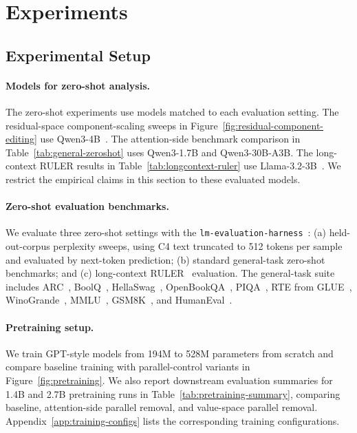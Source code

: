 \section{Experiments}
\label{sec:experiments}

\subsection{Experimental Setup}
\label{sec:setup}

\paragraph{Models for zero-shot analysis.}
The zero-shot experiments use models matched to each evaluation setting. The
residual-space component-scaling sweeps in
Figure~\ref{fig:residual-component-editing} use Qwen3-4B~\citep{Yang2025Qwen3TR}.
The attention-side benchmark comparison in Table~\ref{tab:general-zeroshot}
uses Qwen3-1.7B and Qwen3-30B-A3B. The long-context RULER results in
Table~\ref{tab:longcontext-ruler} use Llama-3.2-3B~\citep{Dubey2024TheL3}.
We restrict the empirical claims in this section to these evaluated models.

\paragraph{Zero-shot evaluation benchmarks.}
We evaluate three zero-shot settings with the \texttt{lm-evaluation-harness}~\citep{gao2021framework}:
(a) held-out-corpus perplexity sweeps, using C4 text truncated to 512 tokens
per sample and evaluated by next-token prediction;
(b) standard general-task zero-shot benchmarks; and
(c) long-context RULER~\citep{Hsieh2024RULERWT} evaluation.
The general-task suite includes ARC~\citep{Clark2018ThinkYH},
BoolQ~\citep{Clark2019BoolQET}, HellaSwag~\citep{Zellers2019HellaSwagCA},
OpenBookQA~\citep{Mihaylov2018CanAS}, PIQA~\citep{Bisk2019PIQARA},
RTE from GLUE~\citep{Wang2018GLUEAM}, WinoGrande~\citep{Sakaguchi2019AnAW},
MMLU~\citep{Hendrycks2020MeasuringMM}, GSM8K~\citep{Cobbe2021TrainingVT},
and HumanEval~\citep{Chen2021EvaluatingLL}.

\paragraph{Pretraining setup.}
We train GPT-style models from 194M to 528M parameters from scratch and compare
baseline training with parallel-control variants in
Figure~\ref{fig:pretraining}. We also report downstream evaluation summaries
for 1.4B and 2.7B pretraining runs in
Table~\ref{tab:pretraining-summary}, comparing baseline, attention-side
parallel removal, and value-space parallel removal.
Appendix~\ref{app:training-configs} lists the corresponding training
configurations.

